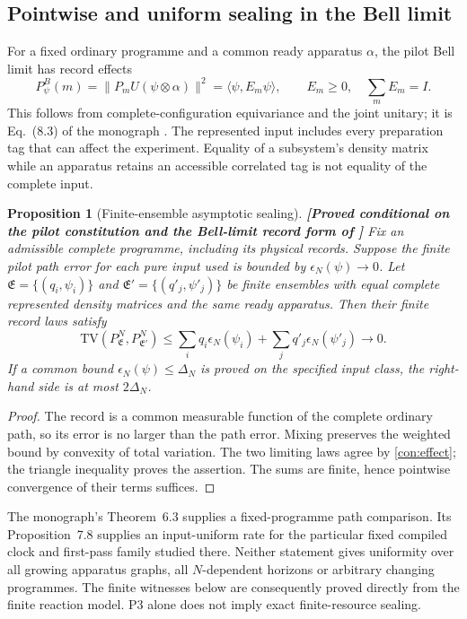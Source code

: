 \documentclass[11pt,a4paper]{article}
\newtheorem{proposition}[theorem]{Proposition}
\theoremstyle{definition}
\theoremstyle{remark}\newtheorem{remark}[theorem]{Remark}
\newcommand{\status}[1]{\textbf{[#1]}\quad}
\newcommand{\TV}{\mathrm{TV}}
\begin{document}
\subsection{Pointwise and uniform sealing in the Bell limit}
For a fixed ordinary programme and a common ready apparatus $\alpha$, the pilot Bell limit has record effects
\begin{equation}\label{con:effect}
 P^B_\psi(m)=\|P_mU(\psi\otimes\alpha)\|^2
 =\langle\psi,E_m\psi\rangle,\qquad E_m\ge0,\quad\sum_mE_m=I.
\end{equation}
This follows from complete-configuration equivariance and the joint unitary; it is Eq.~(8.3) of the monograph \cite{RM}. The represented input includes every preparation tag that can affect the experiment. Equality of a subsystem's density matrix while an apparatus retains an accessible correlated tag is not equality of the complete input.

\begin{proposition}[Finite-ensemble asymptotic sealing]\label{con:ensemblesealing}
\status{Proved conditional on the pilot constitution and the Bell-limit record form of \cite{RM}}
Fix an admissible complete programme, including its physical records. Suppose the finite pilot path error for each pure input used is bounded by $\epsilon_N(\psi)\to0$. Let $\mathfrak E=\{(q_i,\psi_i)\}$ and $\mathfrak E'=\{(q'_j,\psi'_j)\}$ be finite ensembles with equal complete represented density matrices and the same ready apparatus. Then their finite record laws satisfy
\begin{equation}\label{con:ensemblesealingeq}
 \TV(P^N_{\mathfrak E},P^N_{\mathfrak E'})
 \le\sum_iq_i\epsilon_N(\psi_i)
       +\sum_jq'_j\epsilon_N(\psi'_j)\longrightarrow0.
\end{equation}
If a common bound $\epsilon_N(\psi)\le\Delta_N$ is proved on the specified input class, the right-hand side is at most $2\Delta_N$.
\end{proposition}
\begin{proof}
The record is a common measurable function of the complete ordinary path, so its error is no larger than the path error. Mixing preserves the weighted bound by convexity of total variation. The two limiting laws agree by \eqref{con:effect}; the triangle inequality proves the assertion. The sums are finite, hence pointwise convergence of their terms suffices.
\end{proof}

The monograph's Theorem~6.3 supplies a fixed-programme path comparison. Its Proposition~7.8 supplies an input-uniform rate for the particular fixed compiled clock and first-pass family studied there. Neither statement gives uniformity over all growing apparatus graphs, all $N$-dependent horizons or arbitrary changing programmes. The finite witnesses below are consequently proved directly from the finite reaction model. P3 alone does not imply exact finite-resource sealing.
\end{document}
